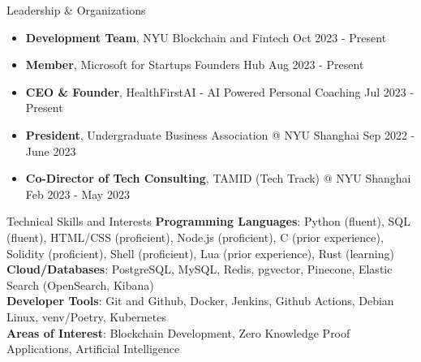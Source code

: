 \documentclass{resume} %
\begin{document}
\begin{rSection}{Leadership \& Organizations}
	\begin{itemize}
		\item \textbf{Development Team}{, NYU Blockchain and Fintech} \hfill Oct 2023 - Present
		\item \textbf{Member}{, Microsoft for Startups Founders Hub} \hfill Aug 2023 - Present
		\item \textbf{CEO \& Founder}{, HealthFirstAI - AI Powered Personal Coaching} \hfill Jul 2023 - Present
		\item \textbf{President}{, Undergraduate Business Association @ NYU Shanghai} \hfill Sep 2022 - June 2023
		\item \textbf{Co-Director of Tech Consulting}{, TAMID (Tech Track) @ NYU Shanghai} \hfill Feb 2023 - May 2023
	\end{itemize}
\end{rSection}


\begin{rSection}{Technical Skills and Interests}
	\textbf{Programming Languages}{: Python (fluent), SQL (fluent), HTML/CSS (proficient), Node.js (proficient), C (prior experience), Solidity (proficient), Shell  (proficient), Lua (prior experience), Rust (learning)} \\
	\textbf{Cloud/Databases}{: PostgreSQL, MySQL, Redis, pgvector, Pinecone, Elastic Search (OpenSearch, Kibana)} \\
	\textbf{Developer Tools}{: Git and Github, Docker, Jenkins, Github Actions, Debian Linux, venv/Poetry, Kubernetes} \\
	\textbf{Areas of Interest}{: Blockchain Development, Zero Knowledge Proof Applications, Artificial Intelligence}
\end{rSection}
\end{document}
